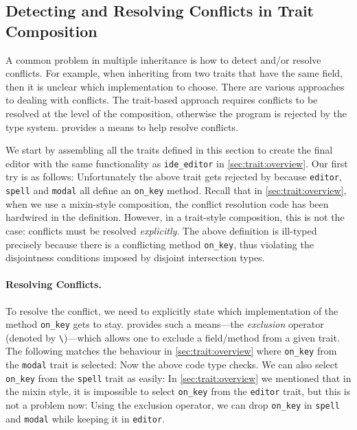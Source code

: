 \subsection{Detecting and Resolving Conflicts in Trait Composition}

A common problem in multiple inheritance is how to detect and/or resolve conflicts. For example, when
inheriting from two traits that have the same field, then it is unclear which
implementation to choose. There are various approaches to dealing with
conflicts. The trait-based approach requires conflicts to be resolved at the
level of the composition, otherwise the program is rejected by
the type system. \sedel provides a means to help resolve conflicts.

We start by assembling all the traits defined in this section
to create the final editor with the same functionality as
\lstinline{ide_editor} in \cref{sec:trait:overview}. Our first try is as follows:
Unfortunately the above trait gets rejected by \sedel because
\lstinline{editor}, \lstinline{spell} and \lstinline{modal} all define an \lstinline{on_key} method.
Recall that in \cref{sec:trait:overview}, when we use a mixin-style composition,
the conflict resolution code has been hardwired in the definition.
However, in a trait-style composition, this is not the case: conflicts must be resolved \emph{explicitly}.
The
above definition is ill-typed precisely because there is a conflicting
method \lstinline{on_key}, thus violating the disjointness conditions
imposed by disjoint intersection types.

\paragraph{Resolving Conflicts.}
To resolve the conflict, we need to explicitly state which implementation of the method
\lstinline{on_key} gets to stay. \sedel provides such a means---the \emph{exclusion} operator (denoted by \lstinline$\$)---which allows one to
exclude a field/method from a given trait. The following matches the behaviour
in \cref{sec:trait:overview} where \lstinline{on_key} from the \lstinline{modal} trait
is selected:
Now the above code type checks. We can also select \lstinline{on_key} from the \lstinline{spell} trait as easily:
In \cref{sec:trait:overview} we mentioned that in the mixin style, it is impossible
to select \lstinline{on_key} from the \lstinline{editor} trait, but this is not a problem now:
Using the exclusion operator, we can drop \lstinline{on_key} in \lstinline{spell} and \lstinline{modal} while
keeping it in \lstinline{editor}.


